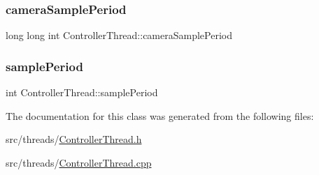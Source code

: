 \subsubsection{\texorpdfstring{camera\+Sample\+Period}{cameraSamplePeriod}}
{\footnotesize\ttfamily long long int Controller\+Thread\+::camera\+Sample\+Period\hspace{0.3cm}{\ttfamily [private]}}

\mbox{\label{classControllerThread_a5dcd0069c7d31295c7e1e598c31fadf7}} 
\subsubsection{\texorpdfstring{sample\+Period}{samplePeriod}}
{\footnotesize\ttfamily int Controller\+Thread\+::sample\+Period\hspace{0.3cm}{\ttfamily [private]}}



The documentation for this class was generated from the following files\+:\begin{DoxyCompactItemize}
\item 
src/threads/\hyperlink{ControllerThread_8h}{Controller\+Thread.\+h}\item 
src/threads/\hyperlink{ControllerThread_8cpp}{Controller\+Thread.\+cpp}\end{DoxyCompactItemize}
